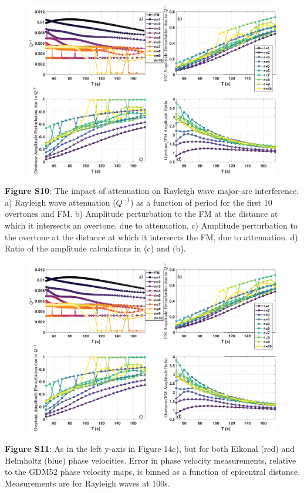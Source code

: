 \documentclass[extra,mreferee]{gji}
\begin{document}
\newpage
\begin{figure}
 \noindent\includegraphics[width=1\textwidth]{FigS10_VSver.eps}
\end{figure}
\textbf{Figure S10}: The impact of attenuation on Rayleigh wave major-arc interference. a) Rayleigh wave attenuation ($Q^{-1}$) as a function of period for the first 10 overtones and FM. b)  Amplitude perturbation to the FM at the distance at which it intersects an overtone, due to attenuation. c) Amplitude perturbation to the overtone at the distance at which it intersects the FM, due to attenuation. d) Ratio of the amplitude calculations in (c) and (b).

\newpage
\begin{figure}
 \noindent\includegraphics[width=1\textwidth]{FigS10_VSver.eps}
\end{figure}
\textbf{Figure S11}: As in the left y-axis in Figure 14c), but for both Eikonal (red) and Helmholtz (blue) phase velocities. Error in phase velocity measurements, relative to the GDM52 phase velocity maps, is binned as a function of epicentral distance. Measurements are for Rayleigh waves at 100s. 
\end{document}
